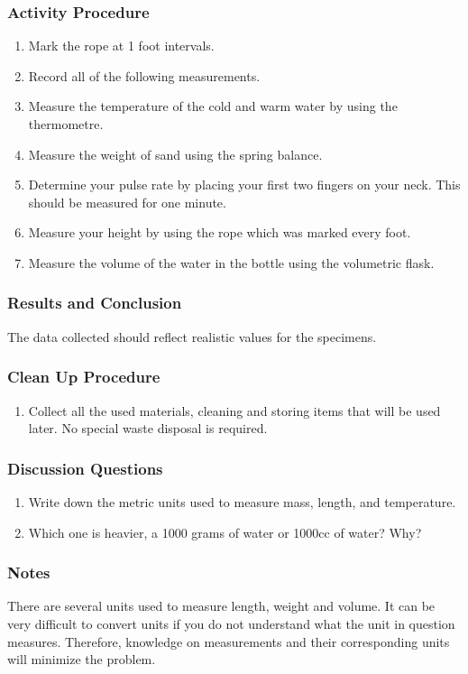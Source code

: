 \subsubsection*{Activity Procedure}
\begin{enumerate}
\item{Mark the rope at 1 foot intervals.}
\item{Record all of the following measurements.}
\item{Measure the temperature of the cold and warm water by using the thermometre.}
\item{Measure the weight of sand using the spring balance.}
\item{Determine your pulse rate by placing your first two fingers on your neck. This should be measured for one minute.}
\item{Measure your height by using the rope which was marked every foot.}
\item{Measure the volume of the water in the bottle using the volumetric flask.}
\end{enumerate}

\subsubsection*{Results and Conclusion}
The data collected should reflect realistic values for the specimens. 

\subsubsection*{Clean Up Procedure}
\begin{enumerate}
\item{Collect all the used materials, cleaning and storing items that will be used later. No special waste disposal is required.}
\end{enumerate}

\subsubsection*{Discussion Questions}
\begin{enumerate}
\item{Write down the metric units used to measure mass, length, and temperature.}
\item{Which one is heavier, a 1000 grams of water or 1000cc of water? Why?}
\end{enumerate}

\subsubsection*{Notes}
There are several units used to measure length, weight and volume. It can be very difficult to convert units if you do not understand what the unit in question measures. Therefore, knowledge on measurements and their corresponding units will minimize the problem.
